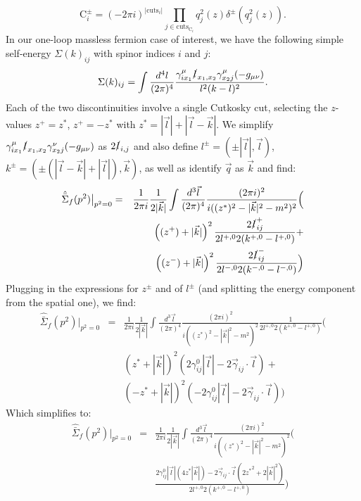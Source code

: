 \documentclass[11pt]{article}
\begin{document}
\begin{equation}
\textrm{C}_i^{\pm} = (-2\pi i)^{|\textrm{cuts}_i|} \prod_{j\in \textrm{cuts}_{\textrm{C}_i}} q_j^2(z) \delta^\pm\left(q_j^2(z)\right).
\end{equation}
In our one-loop massless fermion case of interest, we have the following simple self-energy $\Sigma(k)_{ij}$ with spinor indices $i$ and $j$:
\begin{equation}
\Sigma(k)_{ij} = \int \frac{d^4 l}{(2\pi)^4} \frac{
\gamma_{i{x_1}}^\mu  \slashed{l}_{x_1,x_2} \gamma_{{x_2}j}^\mu (-g_{\mu\nu})
}{l^2(k-l)^2}.
\end{equation}
Each of the two discontinuities involve a single Cutkosky cut, selecting the $z$-values $z^+=z^*$, $z^+=-z^*$ with $z^*=|\vec{l}|+|\vec{l}-\vec{k}|$.
We simplify $\gamma_{i{x_1}}^\mu  \slashed{l}_{x_1,x_2} \gamma_{{x_2}j}^\nu (-g_{\mu\nu})$ as $2 \slashed{l}_{i,j}$ and also define $l^\pm=(\pm |\vec{l}|,\vec{l})$, $k^\pm=(\pm(|\vec{l}-\vec{k}|+|\vec{l}|),\vec{k})$, as well as identify $\vec{q}$ as $\vec{k}$ and find:
\begin{eqnarray}
\hat{\bar{\Sigma}}_{f}(p^2){\big |}_{p^2=0} &=& \frac{ 1 }{2\pi i} \frac{1}{2 |\vec{k}| } \int \frac{d^3 \vec{l}}{(2\pi)^4} \frac{(2\pi i)^2}{i( (z^*)^2 - |\vec{k}|^2-m^2)^2 }\Big ( \nonumber \\
&&\left( (z^+) + |\vec{k}| \right)^2 \frac{ 2 \slashed{l}^+_{ij} }{2l^{+,0}2(k^{+,0}-l^{+,0})} + \nonumber \\
&&\left( (z^-) + |\vec{k}| \right)^2 \frac{ 2 \slashed{l}^-_{ij} }{2l^{-,0}2(k^{-,0}-l^{-,0})}
\Big )
\end{eqnarray}
Plugging in the expressions for $z^\pm$ and of $l^\pm$ (and splitting the energy component from the spatial one), we find:
\begin{eqnarray}
\hat{\bar{\Sigma}}_{f}(p^2){\big |}_{p^2=0} &=& \frac{ 1 }{2\pi i} \frac{1}{2 |\vec{k}| } \int \frac{d^3 \vec{l}}{(2\pi)^4} \frac{(2\pi i)^2}{i( (z^*)^2 - |\vec{k}|^2-m^2)^2 }
\frac{1}{2l^{+,0}2(k^{+,0}-l^{+,0})}
\Big ( \nonumber \\
&&\left( z^* + |\vec{k}| \right)^2 \left( 2 \gamma^0_{ij} |\vec{l}| - 2 \vec{\gamma}_{ij}\cdot \vec{l} \right) + \nonumber \\
&&\left( -z^* + |\vec{k}| \right)^2 \left( -2 \gamma^0_{ij} |\vec{l}| - 2 \vec{\gamma}_{ij}\cdot \vec{l} \right)
\Big )
\end{eqnarray}
Which simplifies to:
\begin{eqnarray}
\hat{\bar{\Sigma}}_{f}(p^2){\big |}_{p^2=0} &=& \frac{ 1 }{2\pi i} \frac{1}{2 |\vec{k}| } \int \frac{d^3 \vec{l}}{(2\pi)^4} \frac{(2\pi i)^2}{i( (z^*)^2 - |\vec{k}|^2-m^2)^2 }
\Big ( \\
&&\frac{
2 \gamma^0_{ij} |\vec{l}| \left( 4 z^* |\vec{k}| \right) - 2 \vec{\gamma}_{ij}\cdot \vec{l} \left( 2{z^*}^2 + 2 |\vec{k}|^2 \right)
}{2l^{+,0}2(k^{+,0}-l^{+,0})}
\Big )
\end{eqnarray}





\end{document}
